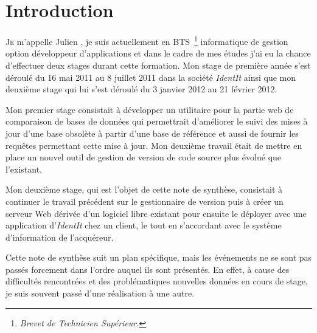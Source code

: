 \chapter{Introduction} %
\label{cha:Introduction}

\lettrine{J}{e} m'appelle Julien , je suis actuellement en
BTS\, \footnote{\emph{Brevet de Technicien Supérieur.}} informatique de
gestion option développeur d'applications et dans le cadre de mes études
j'ai eu la chance d'effectuer deux stages durant cette formation. Mon
stage de première année s'est déroulé du 16 mai 2011 au 8 juillet 2011
dans la société \emph{IdentIt} ainsi que mon deuxième stage qui lui
s'est déroulé du 3 janvier 2012 au 21 février 2012.

Mon premier stage consistait à développer un utilitaire pour la partie
web de comparaison de bases de données qui permettrait d'améliorer le
suivi des mises à jour d'une base obsolète à partir d'une base de
référence et aussi de fournir les requêtes permettant cette mise à jour.
Mon deuxième travail était de mettre en place un nouvel outil de gestion
de version de code source plus évolué que l'existant.

Mon deuxième stage, qui est l'objet de cette note de synthèse,
consistait à continuer le travail précédent sur le gestionnaire de
version puis à créer un serveur Web dérivée d'un logiciel libre existant
pour ensuite le déployer avec une application d'\emph{IdentIt} chez un
client, le tout en s'accordant avec le système d'information de
l'acquéreur.

Cette note de synthèse suit un plan spécifique, mais les événements ne
se sont pas passés forcement dans l'ordre auquel ils sont présentés. En
effet, à cause des difficultés rencontrées et des problématiques
nouvelles données en cours de stage, je suis souvent passé d'une
réalisation à une autre.
